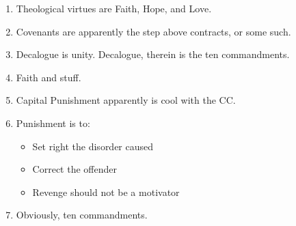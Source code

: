 \documentclass[11pt]{article}
\begin{document}
\begin{enumerate}
	\item Theological virtues are Faith, Hope, and Love.
	\item Covenants are apparently the step above contracts, or some such.
	\item Decalogue is unity.  Decalogue, therein is the ten commandments.
	\item Faith and stuff.
	\item Capital Punishment apparently is cool with the CC.
	\item Punishment is to:
		\begin{itemize}
			\item Set right the disorder caused
			\item Correct the offender
			\item Revenge should not be a motivator
		\end{itemize}
	\item Obviously, ten commandments.
\end{enumerate}
\end{document}
